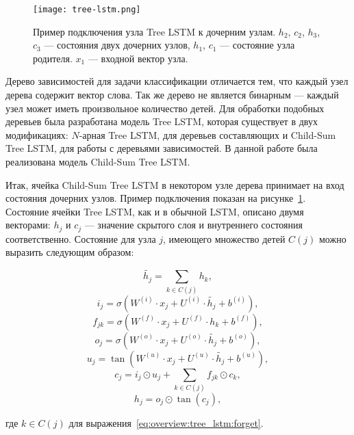 \begin{figure}[h]
  \begin{center}
    \texttt{[image: tree-lstm.png]}
    \caption{Пример подключения узла Tree LSTM к дочерним узлам. $h_2$, $c_2$, $h_3$, $c_3$ --- состояния двух дочерних узлов, $h_1$, $c_1$ --- состояние узла родителя. $x_1$ --- входной вектор узла.}\label{fig:overview:tree_lstm}
  \end{center}
\end{figure}

Дерево зависимостей для задачи классификации отличается тем, что каждый узел дерева содержит вектор слова. Так же дерево не является бинарным --- каждый узел может иметь произвольное количество детей. Для обработки подобных деревьев была разработана модель Tree LSTM, которая существует в двух модификациях: $N$-арная Tree LSTM, для деревьев составляющих и Child-Sum Tree LSTM, для работы с деревьями зависимостей. В данной работе была реализована модель Child-Sum Tree LSTM\cite{tree_lstm}.

Итак, ячейка Child-Sum Tree LSTM в некотором узле дерева принимает на вход состояния дочерних узлов. Пример подключения показан на рисунке~\ref{fig:overview:tree_lstm}. Состояние ячейки Tree LSTM, как и в обычной LSTM, описано двумя векторами: $h_j$ и $c_j$ --- значение скрытого слоя и внутреннего состояния соответственно. Состояние для узла $j$, имеющего множество детей $C(j)$ можно выразить следующим образом:

\begin{equation}
  \tilde{h_j} = \sum_{k\in{C(j)}}h_k,
\end{equation}
\begin{equation}
  i_j = \sigma(W^{(i)}\cdot{x_j} + U^{(i)}\cdot{\tilde{h_j}} + b^{(i)}),
\end{equation}
\begin{equation}
  \label{eq:overview:tree_lstm:forget}
  f_{jk} = \sigma(W^{(f)}\cdot{x_j} + U^{(f)}\cdot{h_k} + b^{(f)}),
\end{equation}
\begin{equation}
  o_j = \sigma(W^{(o)}\cdot{x_j} + U^{(o)}\cdot{\tilde{h_j}} + b^{(o)}),
\end{equation}
\begin{equation}
  u_j = \tan(W^{(u)}\cdot{x_j} + U^{(u)}\cdot{\tilde{h_j}} + b^{(u)}),
\end{equation}
\begin{equation}
  c_j = i_j\odot{u_j} + \sum_{k\in{C(j)}}f_{jk}\odot{c_k},
\end{equation}
\begin{equation}
  h_j = o_j\odot{\tan(c_j)},
\end{equation}
\begin{explanationx}
\item [где] $k\in{C(j)}$ для выражения~\ref{eq:overview:tree_lstm:forget}.
\end{explanationx}

